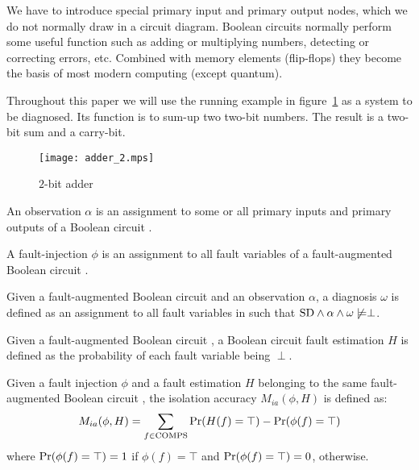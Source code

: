 \documentclass{article}
\begin{document}
%
We have to introduce special primary input and primary output nodes,
which we do not normally draw in a circuit diagram. Boolean circuits
normally perform some useful function such as adding or multiplying
numbers, detecting or correcting errors, etc. Combined with memory
elements (flip-flops) they become the basis of most modern computing
(except quantum).
\par
Throughout this paper we will use the running example in
figure~\ref{fig:adder} as a system to be diagnosed. Its function is to
sum-up two two-bit numbers. The result is a two-bit sum and a
carry-bit.
%
\begin{figure}[htb]
\centering
\texttt{[image: adder\_2.mps]}
\caption{$2$-bit adder\label{fig:adder}}
\end{figure}
%
\begin{definition}
\end{definition}

\begin{definition}[Observation]
  An observation $\alpha$ is an assignment to some or all primary
  inputs and primary outputs of a Boolean circuit \model.
\end{definition}

\begin{definition}
  A fault-injection $\phi$ is an assignment to all fault variables of
  a fault-augmented Boolean circuit \sd.
\end{definition}

\begin{definition}[Diagnosis]
  Given a fault-augmented Boolean circuit \sd and an observation
  $\alpha$, a diagnosis $\omega$ is defined as an assignment to all
  fault variables in \sd such that $\mathrm{SD} \wedge \alpha \wedge \omega
  \not\models \perp$.
\end{definition}

\begin{definition}
  Given a fault-augmented Boolean circuit \sd, a Boolean circuit
  fault estimation $H$ is defined as the probability of each fault
  variable being $\perp$.
\end{definition}

\begin{definition}
  Given a fault injection $\phi$ and a fault estimation $H$ belonging
  to the same fault-augmented Boolean circuit \sd, the isolation
  accuracy $M_{ia}(\phi, H)$ is defined as:
  \begin{eqnarray}
    M_{ia}(\phi, H) = \sum_{f \in \mathrm{COMPS}}{\mbox{Pr}(H(f) = \top) - \mbox{Pr}(\phi(f) = \top)}
  \end{eqnarray}
  where $\mbox{Pr}(\phi(f) = \top) = 1$ if $\phi(f) = \top$ and
  $\mbox{Pr}(\phi(f) = \top) = 0$, otherwise.
\end{definition}
%
\end{document}
